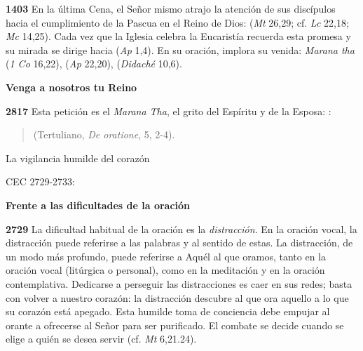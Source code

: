 \textbf{1403} En la última Cena, el Señor mismo atrajo la atención de sus discípulos hacia el cumplimiento de la Pascua en el Reino de Dios:  (\emph{Mt} 26,29; cf. \emph{Lc} 22,18; \emph{Mc} 14,25). Cada vez que la Iglesia celebra la Eucaristía recuerda esta promesa y su mirada se dirige hacia  (\emph{Ap} 1,4). En su oración, implora su venida: \emph{Marana tha} (\emph{1 Co} 16,22),  (\emph{Ap} 22,20),  (\emph{Didaché} 10,6).

\textbf{Venga a nosotros tu Reino}

\textbf{2817} Esta petición es el \emph{Marana Tha}, el grito del Espíritu y de la Esposa: :

\begin{quote}  (Tertuliano, \emph{De oratione}, 5, 2-4). \end{quote}

La vigilancia humilde del corazón

CEC 2729-2733:

\textbf{Frente a las dificultades de la oración}

\textbf{2729} La dificultad habitual de la oración es la \emph{distracción}. En la oración vocal, la distracción puede referirse a las palabras y al sentido de estas. La distracción, de un modo más profundo, puede referirse a Aquél al que oramos, tanto en la oración vocal (litúrgica o personal), como en la meditación y en la oración contemplativa. Dedicarse a perseguir las distracciones es caer en sus redes; basta con volver a nuestro corazón: la distracción descubre al que ora aquello a lo que su corazón está apegado. Esta humilde toma de conciencia debe empujar al orante a ofrecerse al Señor para ser purificado. El combate se decide cuando se elige a quién se desea servir (cf. \emph{Mt} 6,21.24).

